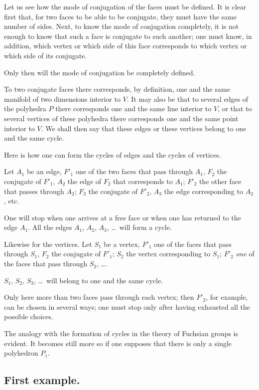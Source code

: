 \documentclass{article}
\begin{document}
Let us see how the mode of conjugation of the faces must be defined. It is clear first that, for two faces to be able to be conjugate, they must have the same number of sides. Next, to know the mode of conjugation completely, it is not enough to know that such a face is conjugate to such another; one must know, in addition, which vertex or which side of this face corresponds to which vertex or which side of its conjugate.

Only then will the mode of conjugation be completely defined.

To two conjugate faces there corresponds, by definition, one and the same manifold of two dimensions interior to $V$. It may also be that to several edges of the polyhedra $P$ there corresponds one and the same line interior to $V$, or that to several vertices of these polyhedra there corresponds one and the same point interior to $V$. We shall then say that these edges or these vertices belong to one and the same cycle.

Here is how one can form the cycles of edges and the cycles of vertices.

Let $A_{1}$ be an edge, $F'_{1}$ one of the two faces that pass through $A_{1}$, $F_{2}$ the conjugate of $F'_{1}$, $A_{2}$ the edge of $F_{2}$ that corresponds to $A_{1}$; $F'_{2}$ the other face that passes through $A_{2}$; $F_{3}$ the conjugate of $F'_{2}$, $A_{3}$ the edge corresponding to $A_{2}$, etc.

One will stop when one arrives at a free face or when one has
returned to the edge $A_{1}$. All the edges $A_{1}$, $A_{2}$, $A_{3}$, \ldots\ will form a cycle.

Likewise for the vertices. Let $S_{1}$ be a vertex, $F'_{1}$ one of the faces that pass through $S_{1}$, $F_{2}$ the conjugate of $F'_{1}$; $S_{2}$ the vertex corresponding to $S_{1}$; $F'_{2}$ \emph{one} of the faces that pass through $S_{2}$, \ldots.

$S_{1}$, $S_{2}$, $S_{3}$, \ldots\ will belong to one and the same cycle.

Only here more than two faces pass through each vertex; then $F'_{2}$, for example, can be chosen in several ways; one must stop only after having exhausted all the possible choices.

The analogy with the formation of cycles in the theory of Fuchsian groups is evident. It becomes still more so if one supposes that there is only a single polyhedron $P_{1}$.

\subsection*{First example.}
\end{document}
